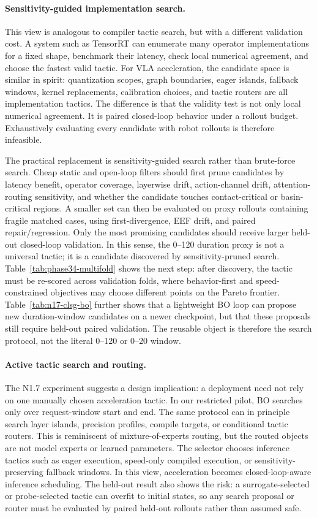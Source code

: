 \documentclass[10pt]{article}
\begin{document}
\paragraph{Sensitivity-guided implementation search.}
This view is analogous to compiler tactic search, but with a different validation cost. A system such as TensorRT can enumerate many operator implementations for a fixed shape, benchmark their latency, check local numerical agreement, and choose the fastest valid tactic. For VLA acceleration, the candidate space is similar in spirit: quantization scopes, graph boundaries, eager islands, fallback windows, kernel replacements, calibration choices, and tactic routers are all implementation tactics. The difference is that the validity test is not only local numerical agreement. It is paired closed-loop behavior under a rollout budget. Exhaustively evaluating every candidate with robot rollouts is therefore infeasible.

The practical replacement is sensitivity-guided search rather than brute-force search. Cheap static and open-loop filters should first prune candidates by latency benefit, operator coverage, layerwise drift, action-channel drift, attention-routing sensitivity, and whether the candidate touches contact-critical or basin-critical regions. A smaller set can then be evaluated on proxy rollouts containing fragile matched cases, using first-divergence, EEF drift, and paired repair/regression. Only the most promising candidates should receive larger held-out closed-loop validation. In this sense, the 0--120 duration proxy is not a universal tactic; it is a candidate discovered by sensitivity-pruned search. Table~\ref{tab:phase34-multifold} shows the next step: after discovery, the tactic must be re-scored across validation folds, where behavior-first and speed-constrained objectives may choose different points on the Pareto frontier. Table~\ref{tab:n17-clsg-bo} further shows that a lightweight BO loop can propose new duration-window candidates on a newer checkpoint, but that these proposals still require held-out paired validation. The reusable object is therefore the search protocol, not the literal 0--120 or 0--20 window.

\paragraph{Active tactic search and routing.}
The N1.7 experiment suggests a design implication: a deployment need not rely on one manually chosen acceleration tactic. In our restricted pilot, BO searches only over request-window start and end. The same protocol can in principle search layer islands, precision profiles, compile targets, or conditional tactic routers. This is reminiscent of mixture-of-experts routing, but the routed objects are not model experts or learned parameters. The selector chooses inference tactics such as eager execution, speed-only compiled execution, or sensitivity-preserving fallback windows. In this view, acceleration becomes closed-loop-aware inference scheduling. The held-out result also shows the risk: a surrogate-selected or probe-selected tactic can overfit to initial states, so any search proposal or router must be evaluated by paired held-out rollouts rather than assumed safe.
\end{document}
